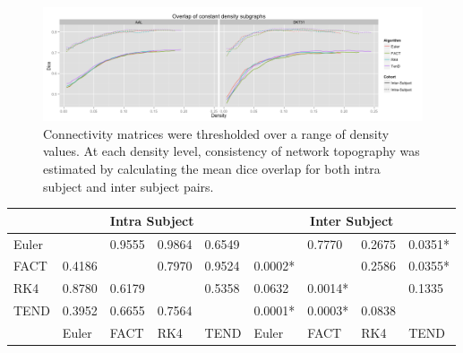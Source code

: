 \documentclass{frontiersSCNS} %
\begin{document}
\begin{figure}
\begin{center}
\includegraphics[width=0.5\linewidth]{figures/dice_overlap_plot.png} 
\caption{Connectivity matrices were thresholded over a range of density values. At each density level, consistency of network topography was estimated by calculating the mean dice overlap for both intra subject and inter subject pairs.}
\label{fig:dice}
\end{center}
\end{figure}


\begin{table}[!t]
{
\begin{tabular}{l | llll | llll }
\midrule
 & \multicolumn{4}{c}{Intra Subject}  & \multicolumn{4}{c}{Inter Subject} \\ 
\midrule
Euler  &            & 0.9555  & 0.9864    & 0.6549   &              & 0.7770  & 0.2675 & 0.0351*  \\
FACT & 0.4186 &              & 0.7970  & 0.9524     & 0.0002*  &             & 0.2586 & 0.0355* \\
RK4   & 0.8780 & 0.6179   &               & 0.5358   & 0.0632   & 0.0014* &            & 0.1335   \\
TEND & 0.3952 & 0.6655  & 0.7564    &            &    0.0001*  & 0.0003* & 0.0838 &               \\             
\midrule
         & Euler    & FACT     & RK4        & TEND      & Euler     & FACT     & RK4     & TEND       \\
\midrule
\end{tabular}}{}
\end{table}
\end{document}
